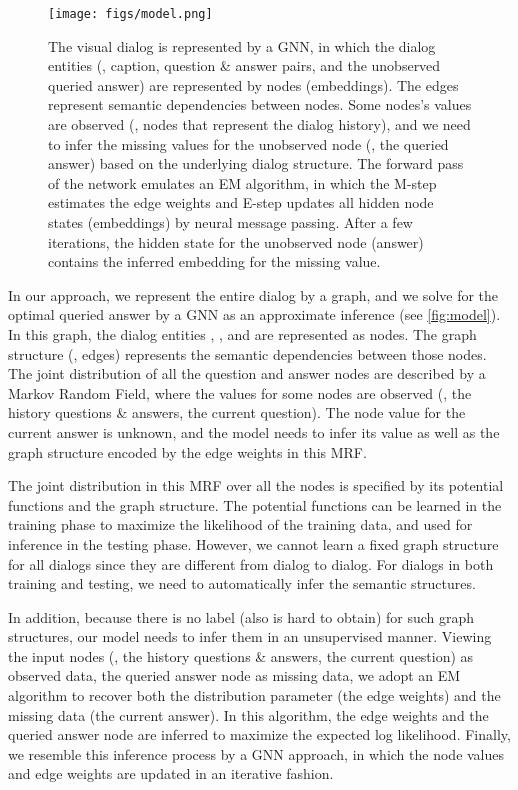 \documentclass[10pt,twocolumn,letterpaper]{article}
\begin{document}
\begin{figure*}[t]
\centering
      \texttt{[image: figs/model.png]}
\caption{\small The visual dialog is represented by a GNN, in which the dialog entities (\ie, caption, question \& answer pairs, and the unobserved queried answer) are represented by nodes (embeddings). The edges represent semantic dependencies between nodes.
Some nodes's values are observed (\ie, nodes that represent the dialog history), and we need to infer the missing values for the unobserved node (\ie, the queried answer) based on the underlying dialog structure.
The forward pass of the network emulates an EM algorithm, in which the M-step estimates the edge weights and E-step updates all hidden node states (embeddings) by neural message passing. After a few iterations, the hidden state for the unobserved node (answer) contains the inferred embedding for the missing value.}
\label{fig:model}
\vspace{-12pt}
\end{figure*}

In our approach, we represent the entire dialog by a graph, and we solve for the optimal queried answer by a GNN as an approximate inference (see \autoref{fig:model}). In this graph, the dialog entities , , and  are represented as nodes. The graph structure (\ie, edges) represents the semantic dependencies between those nodes. The joint distribution of all the question and answer nodes are described by a Markov Random Field, where the values for some nodes are observed (\ie, the history questions \& answers, the current question). The node value for the current answer is unknown, and the model needs to infer its value as well as the graph structure encoded by the edge weights in this MRF.

The joint distribution in this MRF over all the nodes is specified by its potential functions and the graph structure. The potential functions can be learned in the training phase to maximize the likelihood of the training data, and used for inference in the testing phase. However, we cannot learn a fixed graph structure for all dialogs since they are different from dialog to dialog. For dialogs in both training and testing, we need to automatically infer the semantic structures.

In addition, because there is no label (also is hard to obtain) for such graph structures, our model needs to infer them in an unsupervised manner. Viewing the input nodes (\ie, the history questions \& answers, the current question) as observed data, the queried answer node as missing data, we adopt an EM algorithm to recover both the distribution parameter (the edge weights) and the missing data (the current answer). In this algorithm, the edge weights and the queried answer node are inferred to maximize the expected log likelihood. Finally, we resemble this inference process by a GNN approach, in which the node values and edge weights are updated in an iterative fashion.
\end{document}
